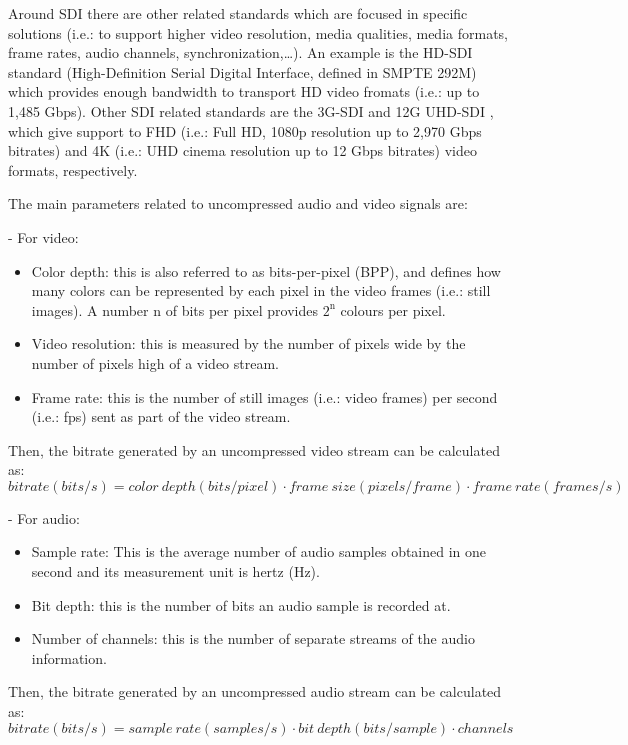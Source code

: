Around SDI there are other related standards which are focused in specific solutions (i.e.: to support higher video resolution, media qualities, media formats, frame rates, audio channels, synchronization,\ldots). An example is the HD-SDI \cite{SDI} standard (High-Definition Serial Digital Interface, defined in SMPTE 292M) which provides enough bandwidth to transport HD video fromats (i.e.: up to 1,485 Gbps). Other SDI related standards are the 3G-SDI \cite{3GSDI} and 12G UHD-SDI \cite{UHDSDI}, which give support to FHD (i.e.: Full HD, 1080p resolution up to 2,970 Gbps bitrates) and 4K (i.e.: UHD cinema resolution up to 12 Gbps bitrates) video formats, respectively. 

The main parameters related to uncompressed audio and video signals are:

- For video:
\begin{itemize}
\item Color depth: this is also referred to as bits-per-pixel (BPP), and defines how many colors can be represented by each pixel in the video frames (i.e.: still images). A number $\mathrm{n}$ of bits per pixel provides $\mathrm{2^{n}}$ colours per pixel.
\item Video resolution: this is measured by the number of pixels wide by the number of pixels high of a video stream.
\item Frame rate: this is the number of still images (i.e.: video frames) per second (i.e.: fps) sent as part of the video stream. 
\end{itemize}

Then, the bitrate generated by an uncompressed video stream can be calculated as:
\begin{equation}\label{E:videobitrate}
bitrate (bits/s) = color\ depth (bits/pixel) \cdot frame\ size (pixels/frame) \cdot frame\ rate (frames/s) 
\end{equation}

- For audio:
\begin{itemize}
\item Sample rate: This is the average number of audio samples obtained in one second and its measurement unit is hertz (Hz).
\item Bit depth: this is the number of bits an audio sample is recorded at.
\item Number of channels: this is the number of separate streams of the audio information.
\end{itemize}

Then, the bitrate generated by an uncompressed audio stream can be calculated as:
\begin{equation}\label{E:videobitrate}
bitrate (bits/s) = sample\ rate (samples/s) \cdot bit\ depth (bits/sample) \cdot channels  
\end{equation}

